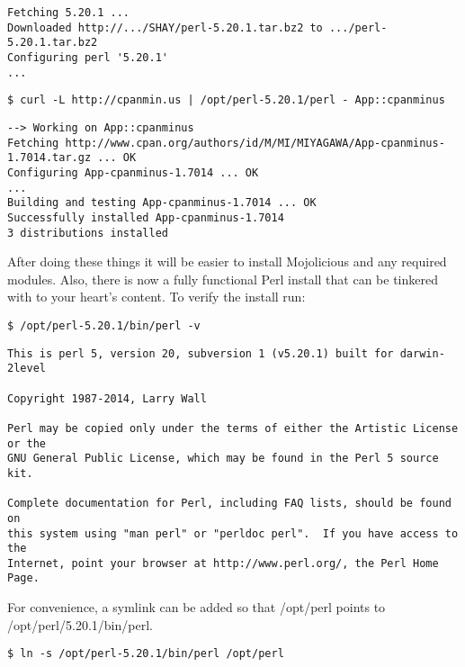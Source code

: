 \documentclass[14pt]{extreport}
\begin{document}
\begin{lstlisting}[style=BashOutputStyle]
Fetching 5.20.1 ...
Downloaded http://.../SHAY/perl-5.20.1.tar.bz2 to .../perl-5.20.1.tar.bz2
Configuring perl '5.20.1'
...
\end{lstlisting}

\begin{lstlisting}[style=BashInputStyle, keepspaces=true]
$ curl -L http://cpanmin.us | /opt/perl-5.20.1/perl - App::cpanminus
\end{lstlisting}

\begin{lstlisting}[style=BashOutputStyle]
--> Working on App::cpanminus
Fetching http://www.cpan.org/authors/id/M/MI/MIYAGAWA/App-cpanminus-1.7014.tar.gz ... OK
Configuring App-cpanminus-1.7014 ... OK
...
Building and testing App-cpanminus-1.7014 ... OK
Successfully installed App-cpanminus-1.7014
3 distributions installed
\end{lstlisting}

After doing these things it will be easier to install Mojolicious and any
required modules.  Also, there is now a fully functional Perl install that can
be tinkered with to your heart's content.  To verify the install run:

\begin{lstlisting}[style=BashInputStyle]
$ /opt/perl-5.20.1/bin/perl -v
\end{lstlisting}

\begin{lstlisting}[style=BashOutputStyle]
This is perl 5, version 20, subversion 1 (v5.20.1) built for darwin-2level

Copyright 1987-2014, Larry Wall

Perl may be copied only under the terms of either the Artistic License or the
GNU General Public License, which may be found in the Perl 5 source kit.

Complete documentation for Perl, including FAQ lists, should be found on
this system using "man perl" or "perldoc perl".  If you have access to the
Internet, point your browser at http://www.perl.org/, the Perl Home Page.
\end{lstlisting}

For convenience, a symlink can be added so that /opt/perl points to
/opt/perl/5.20.1/bin/perl.

\begin{lstlisting}[style=BashInputStyle]
$ ln -s /opt/perl-5.20.1/bin/perl /opt/perl
\end{lstlisting}
\end{document}
